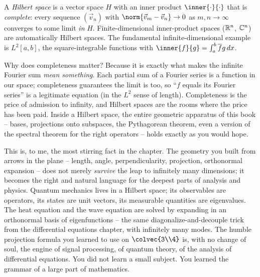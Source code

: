 \begin{formalbox}
A \emph{Hilbert space} is a vector space $H$ with an inner product $\inner{\cdot}{\cdot}$
that is \emph{complete}: every sequence $(\vec{v}_n)$ with $\norm{\vec{v}_m-\vec{v}_n}\to 0$
as $m,n\to\infty$ converges to some limit \emph{in} $H$. Finite-dimensional inner-product
spaces ($\mathbb{R}^n$, $\mathbb{C}^n$) are automatically Hilbert spaces. The fundamental
infinite-dimensional example is $L^2[a,b]$, the square-integrable functions with
$\inner{f}{g}=\int_a^b \overline{f}g\,dx$.
\end{formalbox}

Why does completeness matter? Because it is exactly what makes the infinite Fourier
sum \emph{mean something}. Each partial sum of a Fourier series is a function in our
space; completeness guarantees the limit is too, so ``$f$ equals its Fourier series''
is a legitimate equation (in the $L^2$ sense of length). Completeness is the price
of admission to infinity, and Hilbert spaces are the rooms where the price has been
paid. Inside a Hilbert space, the entire geometric apparatus of this book -- bases,
projections onto subspaces, the Pythagorean theorem, even a version of the spectral
theorem for the right operators -- holds exactly as you would hope.

\begin{aestheticbox}
This is, to me, the most stirring fact in the chapter. The geometry you built from
arrows in the plane -- length, angle, perpendicularity, projection, orthonormal
expansion -- does not merely \emph{survive} the leap to infinitely many dimensions;
it becomes the right and natural language for the deepest parts of analysis and
physics. Quantum mechanics lives in a Hilbert space; its observables are operators,
its states are unit vectors, its measurable quantities are eigenvalues. The heat
equation and the wave equation are solved by expanding in an orthonormal basis of
eigenfunctions -- the same diagonalize-and-decouple trick from the differential
equations chapter, with infinitely many modes. The humble projection formula you
learned to use on $\colvec{3\\4}$ is, with no change of soul, the engine of signal
processing, of quantum theory, of the analysis of differential equations. You did
not learn a small subject. You learned the grammar of a large part of mathematics.
\end{aestheticbox}

